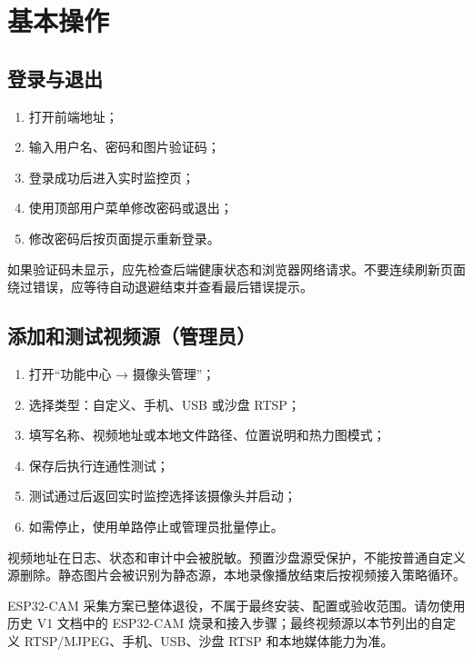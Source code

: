 \section{基本操作}\label{manual-ux57faux672cux64cdux4f5c}

\subsection{登录与退出}\label{manual-ux767bux5f55ux4e0eux9000ux51fa}

\begin{enumerate}
\def\labelenumi{\arabic{enumi}.}
\tightlist
\item
  打开前端地址；
\item
  输入用户名、密码和图片验证码；
\item
  登录成功后进入实时监控页；
\item
  使用顶部用户菜单修改密码或退出；
\item
  修改密码后按页面提示重新登录。
\end{enumerate}

如果验证码未显示，应先检查后端健康状态和浏览器网络请求。不要连续刷新页面绕过错误，应等待自动退避结束并查看最后错误提示。

\subsection{添加和测试视频源（管理员）}\label{manual-ux6dfbux52a0ux548cux6d4bux8bd5ux89c6ux9891ux6e90ux7ba1ux7406ux5458}

\begin{enumerate}
\def\labelenumi{\arabic{enumi}.}
\tightlist
\item
  打开``功能中心 → 摄像头管理''；
\item
  选择类型：自定义、手机、USB 或沙盘 RTSP；
\item
  填写名称、视频地址或本地文件路径、位置说明和热力图模式；
\item
  保存后执行连通性测试；
\item
  测试通过后返回实时监控选择该摄像头并启动；
\item
  如需停止，使用单路停止或管理员批量停止。
\end{enumerate}

视频地址在日志、状态和审计中会被脱敏。预置沙盘源受保护，不能按普通自定义源删除。静态图片会被识别为静态源，本地录像播放结束后按视频接入策略循环。

ESP32-CAM 采集方案已整体退役，不属于最终安装、配置或验收范围。请勿使用历史 V1 文档中的 ESP32-CAM 烧录和接入步骤；最终视频源以本节列出的自定义 RTSP/MJPEG、手机、USB、沙盘 RTSP 和本地媒体能力为准。

